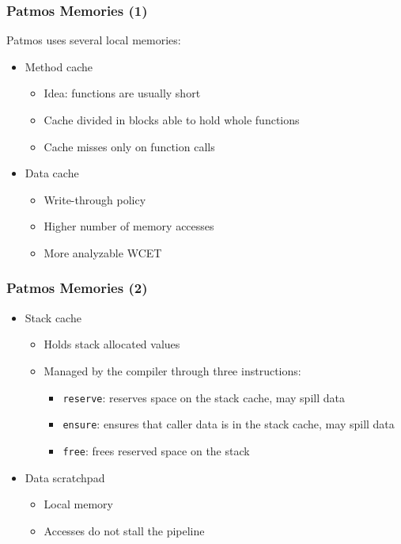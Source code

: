 \documentclass[notheorems]{beamer}
\begin{document}
\begin{frame}
\frametitle{Patmos Memories (1)}
Patmos uses several local memories:
\begin{itemize}
	\item Method cache~\cite{Schoeberl04atime}
		\begin{itemize}
			\item Idea: functions are usually short
			\item Cache divided in blocks able to hold whole functions
			\item Cache misses only on function calls
		\end{itemize}
	\item Data cache
		\begin{itemize}
			\item Write-through policy
			\item Higher number of memory accesses
			\item More analyzable WCET
		\end{itemize}
\end{itemize}
\end{frame}

\begin{frame}
\frametitle{Patmos Memories (2)}
\begin{itemize}
	\item Stack cache~\cite{patmos:stack:seus}
		\begin{itemize}
			\item Holds stack allocated values
			\item Managed by the compiler through three instructions:
				\begin{itemize}
					\item \texttt{reserve}: reserves space on the stack cache, may spill data
					\item \texttt{ensure}: ensures that caller data is in the stack cache, may spill data
					\item \texttt{free}: frees reserved space on the stack
				\end{itemize}
		\end{itemize}
	\item Data scratchpad
		\begin{itemize}
			\item Local memory
			\item Accesses do not stall the pipeline
		\end{itemize}
\end{itemize}
\end{frame}
\end{document}
